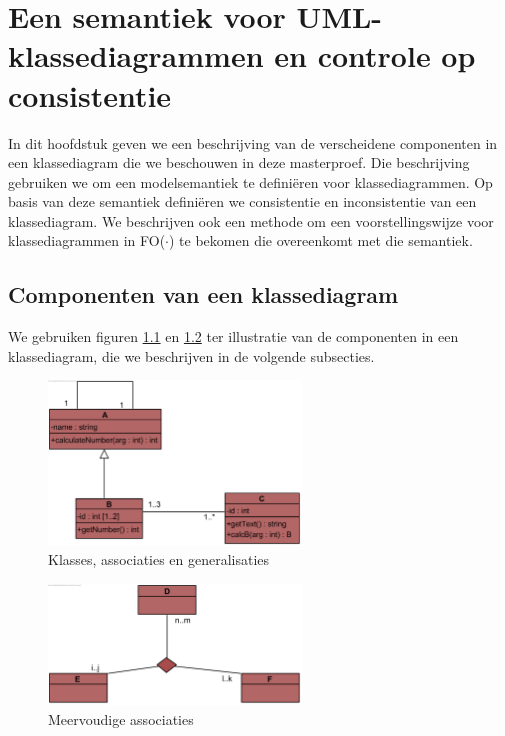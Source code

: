 \chapter{Een semantiek voor UML-klassediagrammen en controle op consistentie}\label{sec:consistentie}
In dit hoofdstuk geven we een beschrijving van de verscheidene componenten in een klassediagram die we beschouwen in deze masterproef. Die beschrijving gebruiken we om een modelsemantiek te defini\"eren voor klassediagrammen. Op basis van deze semantiek defini\"eren we consistentie en inconsistentie van een klassediagram. We beschrijven ook een methode om een voorstellingswijze voor klassediagrammen in FO($\cdot$) te bekomen die overeenkomt met die semantiek.

\section{Componenten van een klassediagram}\label{sec:cd-components}

We gebruiken figuren \ref{fig:voorbeeld1} en \ref{fig:voorbeeld2} ter illustratie van de componenten in een klassediagram, die we beschrijven in de volgende subsecties.

\begin{figure}[h]
	\centering
	\includegraphics[width=0.6\textwidth]{chap-consistentie/voorbeeld1.png}
	\caption{Klasses, associaties en generalisaties}
	\label{fig:voorbeeld1}
\end{figure}

\begin{figure}[h]
	\centering
	\includegraphics[width=0.6\textwidth]{chap-consistentie/voorbeeld2.png}
	\caption{Meervoudige associaties}
	\label{fig:voorbeeld2}
\end{figure}

